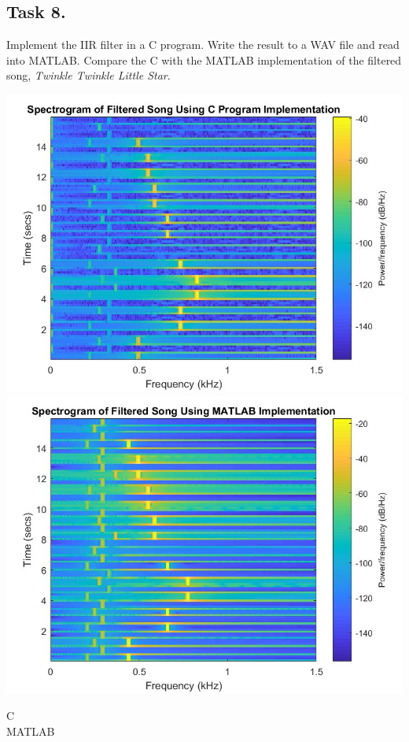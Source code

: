 \documentclass{article}
\begin{document}
    \subsection{Task 8.} Implement the IIR filter in a C program. Write the result to a WAV file and read into MATLAB. Compare the C with the MATLAB implementation of the filtered song, \textit{Twinkle Twinkle Little Star}.
    \begin{center}
            \includegraphics[scale=0.2]{task8a.jpg}
            \includegraphics[scale=0.2]{task8b.jpg}
        \end{center}
        \begin{multicols}{2}
            \begin{center}
                C\\
                \columnbreak
                MATLAB
            \end{center}
        \end{multicols}
\end{document}
